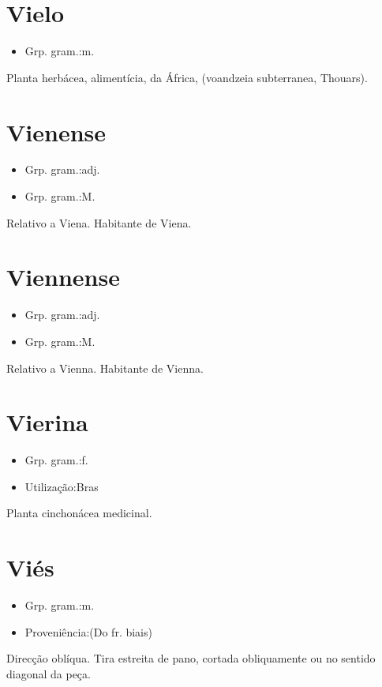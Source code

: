 \documentclass{article}
\begin{document}
\section{Vielo}
\begin{itemize}
\item {Grp. gram.:m.}
\end{itemize}
Planta herbácea, alimentícia, da África, (\textunderscore voandzeia subterranea\textunderscore , Thouars).
\section{Vienense}
\begin{itemize}
\item {Grp. gram.:adj.}
\end{itemize}
\begin{itemize}
\item {Grp. gram.:M.}
\end{itemize}
Relativo a Viena.
Habitante de Viena.
\section{Viennense}
\begin{itemize}
\item {Grp. gram.:adj.}
\end{itemize}
\begin{itemize}
\item {Grp. gram.:M.}
\end{itemize}
Relativo a Vienna.
Habitante de Vienna.
\section{Vierina}
\begin{itemize}
\item {Grp. gram.:f.}
\end{itemize}
\begin{itemize}
\item {Utilização:Bras}
\end{itemize}
Planta cinchonácea medicinal.
\section{Viés}
\begin{itemize}
\item {Grp. gram.:m.}
\end{itemize}
\begin{itemize}
\item {Proveniência:(Do fr. \textunderscore biais\textunderscore )}
\end{itemize}
Direcção oblíqua.
Tira estreita de pano, cortada obliquamente ou no sentido diagonal da peça.
\end{document}
